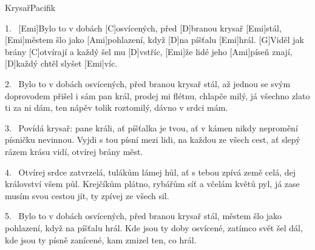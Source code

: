 \begin{song}{Krysař}{Pacifik}

\begin{xverse}{1.~}
[Emi]Bylo to v dobách [C]osvícených, před [D]branou krysař [Emi]stál,
[Emi]městem šlo jako [Ami]pohlazení, když [D]na píšťalu [Emi]hrál.
[G]Viděl jak brány [C]otvírají a každý šel mu [D]vstříc,
[Emi]{že} lidé jeho [Ami]píseň znají, [D]každý chtěl slyšet [Emi]víc.
\end{xverse}


\begin{xverse}{2.~}
Bylo to v dobách osvícených, před branou krysař stál,
až jednou se svým doprovodem přišel i sám pan král,
prodej mi flétnu, chlapče milý, já všechno zlato ti za ni dám,
ten nápěv tolik roztomilý, dávno v srdci mám.
\end{xverse}


\begin{xverse}{3.~}
Povídá krysař: pane králi, ať píšťalka je tvou,
ať v kámen nikdy nepromění písničku nevinnou.
Vyjdi s tou písní mezi lidi, na každou ze všech cest,
ať slepý rázem krásu vidí, otvírej brány měst.
\end{xverse}


\begin{xverse}{4.~}
Otvírej srdce zatvrzelá, tulákům lámej hůl,
ať s tebou zpívá země celá, dej království všem půl.
Krejčíkům plátno, rybářům síť a včelám květů pyl,
já zase musím svou cestou jít, ty zpívej ze všech sil.
\end{xverse}


\begin{xverse}{5.~}
Bylo to v dobách osvícených, před branou krysař stál,
městem šlo jako pohlazení, když na píšťalu hrál.
Kde jsou ty doby osvícené, zatímco svět šel dál,
kde jsou ty písně zanícené, kam zmizel ten, co hrál.
\end{xverse}
\end{song}

